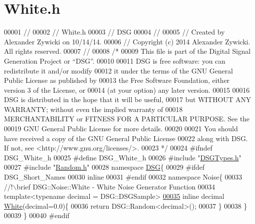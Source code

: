 \hypertarget{_white_8h_source}{\section{White.\+h}
\label{_white_8h_source}
}

\begin{DoxyCode}
00001 \textcolor{comment}{//}
00002 \textcolor{comment}{//  White.h}
00003 \textcolor{comment}{//  DSG}
00004 \textcolor{comment}{//}
00005 \textcolor{comment}{//  Created by Alexander Zywicki on 10/14/14.}
00006 \textcolor{comment}{//  Copyright (c) 2014 Alexander Zywicki. All rights reserved.}
00007 \textcolor{comment}{//}
00008 \textcolor{comment}{/*}
00009 \textcolor{comment}{ This file is part of the Digital Signal Generation Project or “DSG”.}
00010 \textcolor{comment}{}
00011 \textcolor{comment}{ DSG is free software: you can redistribute it and/or modify}
00012 \textcolor{comment}{ it under the terms of the GNU General Public License as published by}
00013 \textcolor{comment}{ the Free Software Foundation, either version 3 of the License, or}
00014 \textcolor{comment}{ (at your option) any later version.}
00015 \textcolor{comment}{}
00016 \textcolor{comment}{ DSG is distributed in the hope that it will be useful,}
00017 \textcolor{comment}{ but WITHOUT ANY WARRANTY; without even the implied warranty of}
00018 \textcolor{comment}{ MERCHANTABILITY or FITNESS FOR A PARTICULAR PURPOSE.  See the}
00019 \textcolor{comment}{ GNU General Public License for more details.}
00020 \textcolor{comment}{}
00021 \textcolor{comment}{ You should have received a copy of the GNU General Public License}
00022 \textcolor{comment}{ along with DSG.  If not, see <http://www.gnu.org/licenses/>.}
00023 \textcolor{comment}{ */}
00024 \textcolor{preprocessor}{#ifndef DSG\_White\_h}
00025 \textcolor{preprocessor}{#define DSG\_White\_h}
00026 \textcolor{preprocessor}{#include "\hyperlink{_d_s_g_types_8h}{DSGTypes.h}"}
00027 \textcolor{preprocessor}{#include "\hyperlink{_random_8h}{Random.h}"}
00028 \textcolor{keyword}{namespace }\hyperlink{namespace_d_s_g}{DSG}\{
00029 \textcolor{preprocessor}{#ifdef DSG\_Short\_Names}
00030     \textcolor{keyword}{inline}
00031 \textcolor{preprocessor}{#endif}
00032     \textcolor{keyword}{namespace }Noise\{\textcolor{comment}{}
00033 \textcolor{comment}{        //!\(\backslash\)brief DSG::Noise::White - White Noise Generator Function}
00034 \textcolor{comment}{}        \textcolor{keyword}{template}<\textcolor{keyword}{typename} decimal = DSG::DSGSample>
\hypertarget{_white_8h_source_l00035}{}\hyperlink{namespace_d_s_g_1_1_noise_a0d1c4b4522d2e56b1aa604e45ab92066}{00035}         \textcolor{keyword}{inline} decimal \hyperlink{namespace_d_s_g_1_1_noise_a0d1c4b4522d2e56b1aa604e45ab92066}{White}(decimal=0.0)\{
00036             \textcolor{keywordflow}{return} DSG::Random<decimal>();
00037         \}
00038     \}
00039 \}
00040 \textcolor{preprocessor}{#endif}
\end{DoxyCode}

